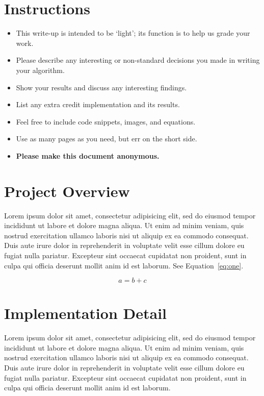 \section*{Instructions}
\begin{itemize}
  \item This write-up is intended to be `light'; its function is to help us grade your work.
  \item Please describe any interesting or non-standard decisions you made in writing your algorithm.
  \item Show your results and discuss any interesting findings.
  \item List any extra credit implementation and its results.
  \item Feel free to include code snippets, images, and equations.
  \item Use as many pages as you need, but err on the short side.
  \item \textbf{Please make this document anonymous.}
\end{itemize}

\section*{Project Overview}

Lorem ipsum dolor sit amet, consectetur adipisicing elit, sed do eiusmod tempor incididunt ut labore et dolore magna aliqua. Ut enim ad minim veniam, quis nostrud exercitation ullamco laboris nisi ut aliquip ex ea commodo consequat. Duis aute irure dolor in reprehenderit in voluptate velit esse cillum dolore eu fugiat nulla pariatur. Excepteur sint occaecat cupidatat non proident, sunt in culpa qui officia deserunt mollit anim id est laborum. See Equation~\ref{eq:one}.

\begin{equation}
a = b + c
\label{eq:one}
\end{equation}

\section*{Implementation Detail}

Lorem ipsum dolor sit amet, consectetur adipisicing elit, sed do eiusmod tempor incididunt ut labore et dolore magna aliqua. Ut enim ad minim veniam, quis nostrud exercitation ullamco laboris nisi ut aliquip ex ea commodo consequat. Duis aute irure dolor in reprehenderit in voluptate velit esse cillum dolore eu fugiat nulla pariatur. Excepteur sint occaecat cupidatat non proident, sunt in culpa qui officia deserunt mollit anim id est laborum.

